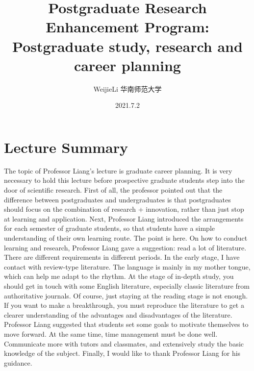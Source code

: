 \documentclass[UTF-8]{ctexart}
\title{Postgraduate Research Enhancement Program: Postgraduate study, research and career planning}
\author{WeijieLi \quad 华南师范大学}
\date{2021.7.2}
\begin{document}
\maketitle
\thispagestyle{empty}
\clearpage

\pagestyle{plain}
\setcounter{page}{1}

\section{Lecture Summary}
The topic of Professor Liang's lecture is graduate career planning. It is very necessary to hold this lecture before prospective graduate students step into the door of scientific research. First of all, the professor pointed out that the difference between postgraduates and undergraduates is that postgraduates should focus on the combination of research + innovation, rather than just stop at learning and application. Next, Professor Liang introduced the arrangements for each semester of graduate students, so that students have a simple understanding of their own learning route. The point is here. On how to conduct learning and research, Professor Liang gave a suggestion: read a lot of literature. There are different requirements in different periods. In the early stage, I have contact with review-type literature. The language is mainly in my mother tongue, which can help me adapt to the rhythm. At the stage of in-depth study, you should get in touch with some English literature, especially classic literature from authoritative journals. Of course, just staying at the reading stage is not enough. If you want to make a breakthrough, you must reproduce the literature to get a clearer understanding of the advantages and disadvantages of the literature. Professor Liang suggested that students set some goals to motivate themselves to move forward. At the same time, time management must be done well. Communicate more with tutors and classmates, and extensively study the basic knowledge of the subject. Finally, I would like to thank Professor Liang for his guidance. 
\end{document}
